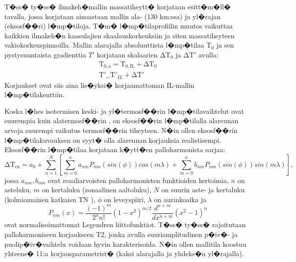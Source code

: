 \documentclass[12pt,a4paper,finnish,margin=2in]{article}
\begin{document}
T�ss� ty�ss� ilmakeh�mallin massatiheytt� korjataan \citet{Doornbos_2007} esitt�m�ll� tavalla, jossa korjataan ainoastaan mallin ala- (130 km:ssa) ja yl�rajan (eksosf��ri) l�mp�tiloja. T�m� l�mp�tilaprofiilin muutos vaikuttaa kaikkien ilmakeh�n kaasulajien skaalauskorkeuksiin ja siten massatiheyteen vakiokorkeuspinnoilla. Mallin alarajalla absoluuttista l�mp�tilaa $\mathrm{T_0}$ ja sen pystysuuntaista gradienttia $T'$ korjataan skalaarien $\mathrm{\Delta T_0}$ ja $\mathrm{\Delta T'}$ avulla:
\begin{align} \label{lb_ass_eq}
\mathrm{T_{0,a}} = \mathrm{T_{0,IL}} + \mathrm{\Delta T_0} \\
\mathrm{T'}_= \mathrm{T'}_{IL} + \mathrm{\Delta T'}
\end{align}
Korjaukset ovat siis aina lis�yksi� korjaamattoman IL-mallin l�mp�tilakenttiin. 

Koska l�hes isotermisen keski- ja yl�termosf��rin l�mp�tilavaihtelut ovat suurempia kuin alatermosf��rin \citep{emmert_2015}, on eksosf��rin l�mp�tilalla alareunan arvoja suurempi vaikutus termosf��rin tiheyteen. N�in ollen eksosf��rin l�mp�tilakuvauksen on syyt� olla alareunan korjauksia realistisempi. Eksosf��rin l�mp�tilaa korjataan k�ytt�en palloharmonista sarjaa:
\begin{equation} \label{deltaTex_eq}
\mathrm{\Delta T_{ex}} = a_0 + \sum_{n=1}^{N}\left [ \sum_{m=0}^{n} a_{nm} P_{nm}(sin(\phi)) cos(m \lambda ) + \sum_{m=0}^{n} b_{nm} P_{nm}(sin(\phi)) sin(m \lambda ) \right ],
\end{equation}
jossa $a_{nm}, b_{nm}$ ovat reaaliarvoisten palloharmonisten funktioiden kertoimia, $n$ on asteluku, $m$ on kertaluku (zonaalinen aaltoluku), $N$ on suurin aste- ja kertaluku (kolmiomainen katkaisu TN \citep{ifs_numerics}), $\phi$ on leveyspiiri, $\lambda$ on aurinkoaika ja 
\begin{equation} \label{legendre_eq}
P_{nm}(x) = \frac{(-1)^m}{2^n n!} (1-x^2)^{m/2} \frac{d^{n+m}}{d x^{n+m}} (x^2 - 1)^n
\end{equation}
ovat normalisoimattomat Legendren liittofunktiot. T�ss� ty�ss� rajoitutaan palloharmoniseen korjaukseen T2, jonka avulla suuriamplitudinen p�iv�- ja puolip�iv�vaihtelu voidaan hyvin karakterisoida. N�in ollen mallitila koostuu yhteens� 11:a korjausparametrist� (kaksi alarajalla ja yhdeks�n yl�rajalla).
\end{document}
